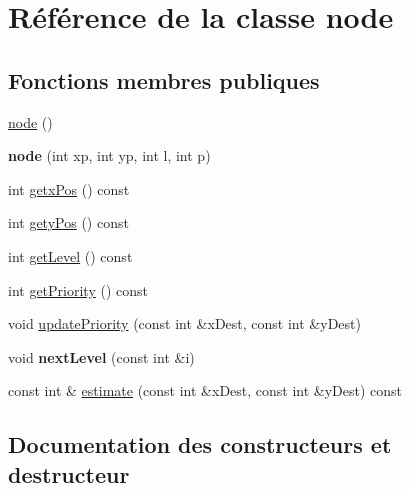 \hypertarget{classnode}{}\section{Référence de la classe node}
\label{classnode}
\subsection*{Fonctions membres publiques}
\begin{DoxyCompactItemize}
\item 
\hyperlink{classnode_a82669b7358b50bd8d7888d7df4ff8dfa}{node} ()
\item 
\hypertarget{classnode_a54d5a4fd2b5bff5b796318ff4d8fa9f1}{}{\bfseries node} (int xp, int yp, int l, int p)\label{classnode_a54d5a4fd2b5bff5b796318ff4d8fa9f1}

\item 
int \hyperlink{classnode_a419596f9858640ee6d04b69b616b7cd2}{getx\+Pos} () const 
\item 
int \hyperlink{classnode_a3b5d135d5e5eac9211a9478ea9803ae7}{gety\+Pos} () const 
\item 
int \hyperlink{classnode_a78c66d7badca074b6b34ec7eca4ab106}{get\+Level} () const 
\item 
int \hyperlink{classnode_afebf5ef7f94fa7554890f03e97686de7}{get\+Priority} () const 
\item 
void \hyperlink{classnode_ad51b92de008bd5107a7b55cc61fc497b}{update\+Priority} (const int \&x\+Dest, const int \&y\+Dest)
\item 
\hypertarget{classnode_a04a186013c42fb942b6da90d2e98d4ed}{}void {\bfseries next\+Level} (const int \&i)\label{classnode_a04a186013c42fb942b6da90d2e98d4ed}

\item 
const int \& \hyperlink{classnode_a311569dff2e77c4c7953107333960a5d}{estimate} (const int \&x\+Dest, const int \&y\+Dest) const 
\end{DoxyCompactItemize}


\subsection{Documentation des constructeurs et destructeur}
\hypertarget{classnode_a82669b7358b50bd8d7888d7df4ff8dfa}{}
